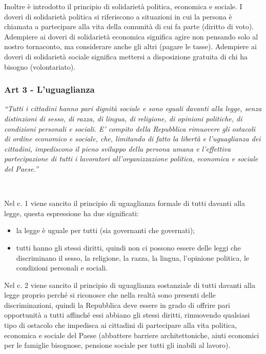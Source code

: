 \documentclass{report}
\begin{document}
Inoltre è introdotto il principio di solidarietà politica, economica e sociale. I doveri di solidarietà politica si
riferiscono a situazioni in cui la persona è chiamata a partecipare alla vita della comunità di cui fa parte (diritto di voto).
Adempiere ai doveri di solidarietà economica significa agire non pensando solo al nostro tornaconto, ma considerare
anche gli altri (pagare le tasse). Adempiere ai doveri di solidarietà sociale significa mettersi a disposizione gratuita di
chi ha bisogno (volontariato).

\subsubsection{Art 3 - L'uguaglianza}
\textit{“Tutti i cittadini hanno pari dignità sociale e sono eguali davanti alla legge, senza distinzioni di sesso, di
razza, di lingua, di religione, di opinioni politiche, di condizioni personali e sociali.
E’ compito della Repubblica rimuovere gli ostacoli di ordine economico e sociale, che, limitando di fatto la libertà e
l’uguaglianza dei cittadini, impediscono il pieno sviluppo della persona umana e l’effettiva partecipazione di tutti i
lavoratori all’organizzazione politica, economica e sociale del Paese.”}

\\


Nel c. 1 viene sancito il principio di uguaglianza formale di tutti davanti alla legge, questa espressione ha due
significati:

\begin{itemize}
  \item la legge è uguale per tutti (sia governanti che governati);
  \item tutti hanno gli stessi diritti, quindi non ci possono essere delle leggi che discriminano il sesso, la religione, la razza,
la lingua, l’opinione politica, le condizioni personali e sociali. 
\end{itemize}



Nel c. 2 viene sancito il principio di uguaglianza sostanziale di tutti davanti alla legge proprio perché si riconosce che
nella realtà sono presenti delle discriminazioni, quindi la Repubblica deve essere in grado di offrire pari opportunità a
tutti affinché essi abbiano gli stessi diritti, rimuovendo qualsiasi tipo di ostacolo che impedisca ai cittadini di partecipare
alla vita politica, economica e sociale del Paese (abbattere barriere architettoniche, aiuti economici per le famiglie
bisognose, pensione sociale per tutti gli inabili al lavoro).
\end{document}
